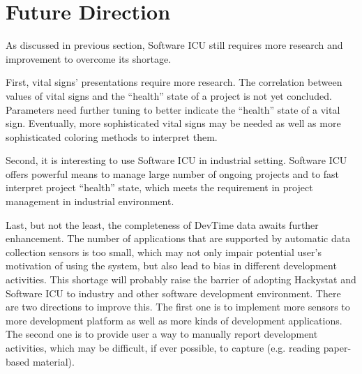 \section{Future Direction}
As discussed in previous section, Software ICU still requires more research and improvement to overcome its shortage.

First, vital signs' presentations require more research. The correlation between values of vital signs and the ``health'' state of a project is not yet concluded. Parameters need further tuning to better indicate the ``health'' state of a vital sign. Eventually, more sophisticated vital signs may be needed as well as more sophisticated coloring methods to interpret them. 

Second, it is interesting to use Software ICU in industrial setting. Software ICU offers powerful means to manage large number of ongoing projects and to fast interpret project ``health'' state, which meets the requirement in project management in industrial environment.
 
Last, but not the least, the completeness of DevTime data awaits further enhancement. The number of applications that are supported by automatic data collection sensors is too small, which may not only impair potential user's motivation of using the system, but also lead to bias in different development activities. This shortage will probably raise the barrier of adopting Hackystat and Software ICU to industry and other software development environment. There are two directions to improve this. The first one is to implement more sensors to more development platform as well as more kinds of development applications. The second one is to provide user a way to manually report development activities, which may be difficult, if ever possible, to capture (e.g. reading paper-based material).


